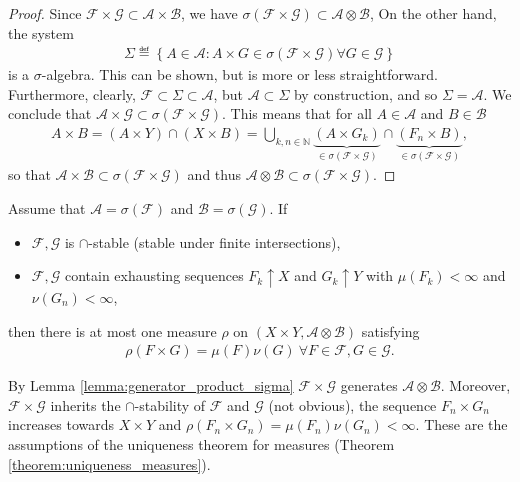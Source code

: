 \ifdetailed
\begin{proof}
    Since \(\mathscr{F}\times\mathscr{G}\subset \mathscr{A}\times \mathscr{B}\), we have \(\sigma(\mathscr{F}\times\mathscr{G})\subset \mathscr{A}\otimes\mathscr{B}\), On the other hand, the system 
    \begin{align*}
        \Sigma\eqdef \left\{A\in\mathscr{A}: A\times G \in \sigma(\mathscr{F}\times\mathscr{G}) \forall G\in\mathscr{G}\right\}
    \end{align*}
    is a \(\sigma\)-algebra. This can be shown, but is more or less straightforward. Furthermore, clearly, \(\mathscr{F}\subset\Sigma\subset \mathscr{A}\), but \(\mathscr{A}\subset \Sigma\) by construction, and so \(\Sigma = \mathscr{A}\). We conclude that \(\mathscr{A}\times\mathscr{G}\subset \sigma(\mathscr{F}\times\mathscr{G})\). This means that for all \(A\in\mathscr{A}\) and \(B\in\mathscr{B}\) 
    \begin{align*}
        A\times B = \left(A\times Y\right)\cap \left(X\times B\right) = \bigcup\limits_{k,n\in\mathbb{N}}\underbrace{\left(A\times G_k\right)}_{\in\sigma(\mathscr{F}\times\mathscr{G})} \cap \underbrace{\left(F_n\times B\right)}_{\in\sigma(\mathscr{F}\times\mathscr{G})},
    \end{align*}
    so that \(\mathscr{A}\times\mathscr{B}\subset\sigma(\mathscr{F}\times\mathscr{G})\) and thus \(\mathscr{A}\otimes\mathscr{B}\subset\sigma(\mathscr{F}\times\mathscr{G})\).
\end{proof}
\fi 
\begin{theorem}
    Assume that \(\mathscr{A}=\sigma(\mathscr{F})\) and \(\mathscr{B}=\sigma(\mathscr{G})\). If
    \begin{itemize}
        \item \(\mathscr{F}, \mathscr{G}\) is \(\cap\)-stable (stable under finite intersections),
        \item \(\mathscr{F}, \mathscr{G}\) contain exhausting sequences \(F_k\uparrow X\) and \(G_k\uparrow Y\) with \(\mu(F_k)<\infty\) and \(\nu(G_n)<\infty\),
    \end{itemize}
    then there is at most one measure \(\rho\) on \((X\times Y, \mathscr{A}\otimes\mathscr{B})\) satisfying
    \begin{align*}
        \rho\left(F\times G\right) = \mu(F)\nu(G) \ \forall F\in\mathscr{F}, G\in\mathscr{G}.
    \end{align*}
\end{theorem}
\ifdetailed
By Lemma \ref{lemma:generator_product_sigma} \(\mathscr{F}\times\mathscr{G}\) generates \(\mathscr{A}\otimes\mathscr{B}\). Moreover, \(\mathscr{F}\times \mathscr{G}\) inherits the \(\cap\)-stability of \(\mathscr{F}\) and \(\mathscr{G}\) (not obvious), the sequence \(F_n\times G_n\) increases towards \(X\times Y\) and \(\rho(F_n\times G_n) = \mu(F_n)\nu(G_n)<\infty\). These are the assumptions of the uniqueness theorem for measures (Theorem \ref{theorem:uniqueness_measures}).
